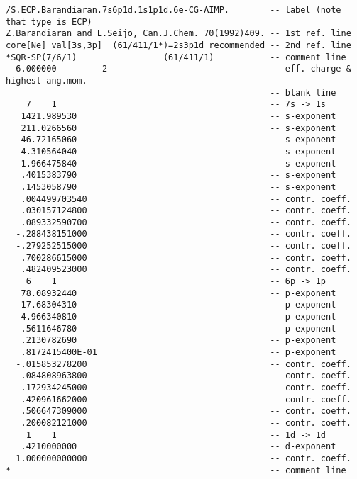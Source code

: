 {\small
\begin{verbatim}
/S.ECP.Barandiaran.7s6p1d.1s1p1d.6e-CG-AIMP.        -- label (note that type is ECP)
Z.Barandiaran and L.Seijo, Can.J.Chem. 70(1992)409. -- 1st ref. line
core[Ne] val[3s,3p]  (61/411/1*)=2s3p1d recommended -- 2nd ref. line
*SQR-SP(7/6/1)                 (61/411/1)           -- comment line
  6.000000         2                                -- eff. charge & highest ang.mom.
                                                    -- blank line
    7    1                                          -- 7s -> 1s 
   1421.989530                                      -- s-exponent
   211.0266560                                      -- s-exponent
   46.72165060                                      -- s-exponent
   4.310564040                                      -- s-exponent
   1.966475840                                      -- s-exponent
   .4015383790                                      -- s-exponent
   .1453058790                                      -- s-exponent
   .004499703540                                    -- contr. coeff.
   .030157124800                                    -- contr. coeff.
   .089332590700                                    -- contr. coeff.
  -.288438151000                                    -- contr. coeff.
  -.279252515000                                    -- contr. coeff.
   .700286615000                                    -- contr. coeff.
   .482409523000                                    -- contr. coeff.
    6    1                                          -- 6p -> 1p
   78.08932440                                      -- p-exponent
   17.68304310                                      -- p-exponent
   4.966340810                                      -- p-exponent
   .5611646780                                      -- p-exponent
   .2130782690                                      -- p-exponent
   .8172415400E-01                                  -- p-exponent
  -.015853278200                                    -- contr. coeff.
  -.084808963800                                    -- contr. coeff.
  -.172934245000                                    -- contr. coeff.
   .420961662000                                    -- contr. coeff.
   .506647309000                                    -- contr. coeff.
   .200082121000                                    -- contr. coeff.
    1    1                                          -- 1d -> 1d
   .4210000000                                      -- d-exponent
  1.000000000000                                    -- contr. coeff.
*                                                   -- comment line

\end{verbatim}}
